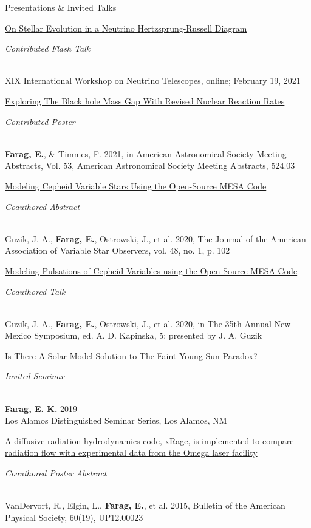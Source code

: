 \begin{rSection}{Presentations \& Invited Talks}
\begin{revnumerate}
\item \parbox[t]{0.74\linewidth}{\href{https://agenda.infn.it/event/25879/attachments/79032/102584/timetable.pdf}{On Stellar Evolution in a Neutrino Hertzsprung-Russell Diagram}}\hfill \parbox[t]{0.24\linewidth}{\raggedleft\em Contributed Flash Talk}
\\ XIX International Workshop on Neutrino Telescopes, online; February 19, 2021

\item \parbox[t]{0.74\linewidth}{\href{https://ui.adsabs.harvard.edu/abs/2021AAS...23752403F/abstract}{Exploring The Black hole Mass Gap With Revised Nuclear Reaction Rates}}\hfill \parbox[t]{0.24\linewidth}{\raggedleft\em Contributed Poster}
\\ \textbf{Farag, E.}, \& Timmes, F. 2021, in American Astronomical Society Meeting Abstracts, Vol. 53, American Astronomical Society Meeting Abstracts, 524.03

\item \parbox[t]{0.74\linewidth}{\href{https://ui.adsabs.harvard.edu/abs/2020JAVSO..48..102G/abstract}{Modeling Cepheid Variable Stars Using the Open-Source MESA Code}}\hfill \parbox[t]{0.24\linewidth}{\raggedleft\em Coauthored Abstract}
\\ Guzik, J. A., \textbf{Farag, E.}, Ostrowski, J., et al. 2020, The Journal of the American Association of Variable Star Observers, vol. 48, no. 1, p. 102

\item \parbox[t]{0.74\linewidth}{\href{https://www.aoc.nrao.edu/events/nmsymposium/2019/contributions/abstract-book.pdf}{Modeling Pulsations of Cepheid Variables using the Open-Source MESA Code}}\hfill \parbox[t]{0.24\linewidth}{\raggedleft\em Coauthored Talk}
\\ Guzik, J. A., \textbf{Farag, E.}, Ostrowski, J., et al. 2020, in The 35th Annual New Mexico Symposium, ed. A. D. Kapinska, 5; presented by J. A. Guzik

\item \parbox[t]{0.74\linewidth}{\href{https://doi.org/10.2172/1545733}{Is There A Solar Model Solution to The Faint Young Sun Paradox?}}\hfill \parbox[t]{0.24\linewidth}{\raggedleft\em Invited Seminar}
\\ \textbf{Farag, E. K.} 2019
\\ Los Alamos Distinguished Seminar Series, Los Alamos, NM

\item \parbox[t]{0.74\linewidth}{\href{https://meetings.aps.org/Meeting/DPP15/Session/UP12.23}{A diffusive radiation hydrodynamics code, xRage, is implemented to compare radiation flow with experimental data from the Omega laser facility}}\hfill \parbox[t]{0.24\linewidth}{\raggedleft\em Coauthored Poster Abstract}
\\ VanDervort, R., Elgin, L., \textbf{Farag, E.}, et al. 2015, Bulletin of the American Physical Society, 60(19), UP12.00023

\end{revnumerate}
\end{rSection}
